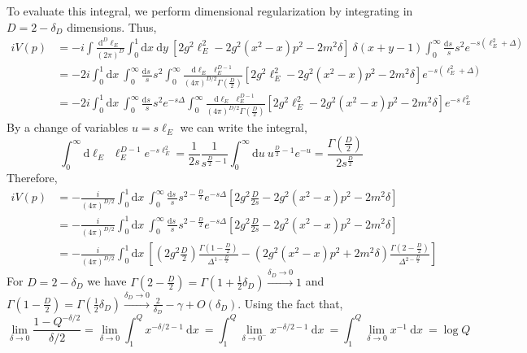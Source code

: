 \documentclass[12pt]{article}
\renewcommand{\d}[1]{ \mathrm{d}#1 \:}
\newcommand{\dn}[2]{ \mathrm{d}^{#1} #2 \:}
\begin{document}
To evaluate this integral, we perform dimensional regularization by integrating in $D  = 2 - \delta_D$ dimensions. Thus, 
\begin{align*}
i V(p) & = -i \int \frac{\dn{D}{\ell_E}}{(2\pi)^D} \int_0^1 \d{x} \d{y} [ 2 g^2 \ell_E^2 - 2 g^2 (x^2 - x) p^2 - 2 m^2 \delta] \: \delta(x + y - 1) \int_0^\infty \frac{\d{s}}{s} s^2 e^{-s (\ell_E^2 + \Delta)} 
\\
& = -2 i \int_0^1 \d{x} \int_0^\infty \frac{\d{s}}{s} s^2 \int_0^\infty \frac{\d{\ell_E} \, \ell_E^{D-1}}{(4\pi)^{D/2} \Gamma\left(\frac{D}{2}\right)} [ 2 g^2 \ell_E^2 - 2 g^2 (x^2 - x) p^2 - 2 m^2 \delta] e^{-s(\ell_E^2 + \Delta)} 
\\
& = -2 i \int_0^1 \d{x} \int_0^\infty \frac{\d{s}}{s} s^2 e^{-s \Delta} \int_0^\infty \frac{\d{\ell_E} \, \ell_E^{D-1}}{(4\pi)^{D/2} \Gamma\left(\frac{D}{2}\right)} [ 2 g^2 \ell_E^2 - 2 g^2 (x^2 - x) p^2 - 2 m^2 \delta] e^{-s \ell_E^2} 
\end{align*} 
By a change of variables $u = s \ell_E$ we can write the integral,
\[ \int_0^\infty \d{\ell_E} \: \ell_E^{D - 1} e^{-s \ell_E^2}  = \frac{1}{2 s} \frac{1}{s^{\frac{D}{2} - 1}} \int_0^\infty \d{u} u^{\frac{D}{2} - 1} e^{-u} = \frac{\Gamma\left(\tfrac{D}{2}\right)}{2 s^{\frac{D}{2}}}  \]
Therefore,
\begin{align*}
i V(p) 
& = -\frac{i}{(4 \pi)^{D/2}} \int_0^1 \d{x} \int_0^\infty \frac{\d{s}}{s} s^{2 - \frac{D}{2}} e^{-s \Delta} \left[ 2 g^2 \frac{D}{2s} - 2 g^2 (x^2 - x) p^2 - 2 m^2 \delta \right]
\\
& = -\frac{i}{(4 \pi)^{D/2}} \int_0^1 \d{x} \int_0^\infty \frac{\d{s}}{s} s^{2 - \frac{D}{2}} e^{-s \Delta} \left[ 2 g^2 \frac{D}{2s} - 2 g^2 (x^2 - x) p^2 - 2 m^2 \delta \right]
\\
& = -\frac{i}{(4 \pi)^{D/2}} \int_0^1 \d{x} \left[ \left(2 g^2  \frac{D}{2} \right) \frac{\Gamma \left(1 - \frac{D}{2} \right)}{\Delta^{1 - \frac{D}{2}}} - \left( 2 g^2 (x^2 - x) p^2 + 2 m^2 \delta \right) \frac{\Gamma \left(2 - \frac{D}{2} \right)}{\Delta^{2 - \frac{D}{2}}} \right]
\end{align*} 
For $D = 2 - \delta_D$ we have $\Gamma\left(2 - \frac{D}{2}\right) = \Gamma(1 + \tfrac{1}{2} \delta_D) \xrightarrow{\delta_D \to 0} 1$ and $\Gamma\left(1 - \frac{D}{2}\right) = \Gamma(\tfrac{1}{2} \delta_D) \xrightarrow{\delta_D \to 0} \frac{2}{\delta_D} - \gamma + O(\delta_D)$.
Using the fact that,
\[ \lim\limits_{\delta \to 0} \frac{1 - Q^{-\delta/2}}{\delta/2} =  \lim\limits_{\delta \to 0} \int_1^Q x^{-\delta/2 - 1} \: \d{x} = \int_1^Q \lim\limits_{\delta \to 0^-} x^{-\delta/2 - 1} \: \d{x}  = \int_1^Q \lim\limits_{\delta \to 0} x^{- 1} \: \d{x} = \log{Q} \]
\end{document}
